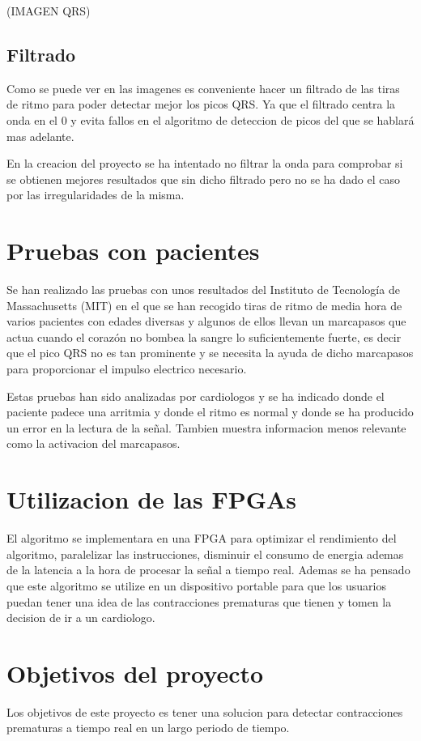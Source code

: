 (IMAGEN QRS)

\subsection{Filtrado}
Como se puede ver en las imagenes es conveniente hacer un filtrado de las tiras de ritmo para poder detectar mejor
los picos QRS. Ya que el filtrado centra la onda en el 0 y evita fallos en el algoritmo de deteccion de picos del 
que se hablará mas adelante. 

En la creacion del proyecto se ha intentado no filtrar la onda para comprobar si se obtienen mejores resultados que
sin dicho filtrado pero no se ha dado el caso por las irregularidades de la misma.

\section{Pruebas con pacientes}
Se han realizado las pruebas con unos resultados del Instituto de Tecnología de Massachusetts (MIT) en el que se han
recogido tiras de ritmo de media hora de varios pacientes con edades diversas y algunos de ellos llevan un marcapasos
que actua cuando el corazón no bombea la sangre lo suficientemente fuerte, es decir que el pico QRS no es tan prominente
y se necesita la ayuda de dicho marcapasos para proporcionar el impulso electrico necesario.

Estas pruebas han sido analizadas por cardiologos y se ha indicado donde el paciente padece una arritmia y donde el ritmo
es normal y donde se ha producido un error en la lectura de la señal. Tambien muestra informacion menos relevante como la 
activacion del marcapasos.

\section{Utilizacion de las FPGAs}
El algoritmo se implementara en una FPGA para optimizar el rendimiento del algoritmo, paralelizar 
las instrucciones, disminuir el consumo de energia ademas de la latencia a la hora de procesar la señal a tiempo real.
Ademas se ha pensado que este algoritmo se utilize en un dispositivo portable para que los usuarios puedan
tener una idea de las contracciones prematuras que tienen y tomen la decision de ir a un cardiologo.

\section{Objetivos del proyecto}
Los objetivos de este proyecto es tener una solucion para detectar contracciones prematuras a tiempo real en un largo periodo 
de tiempo.


